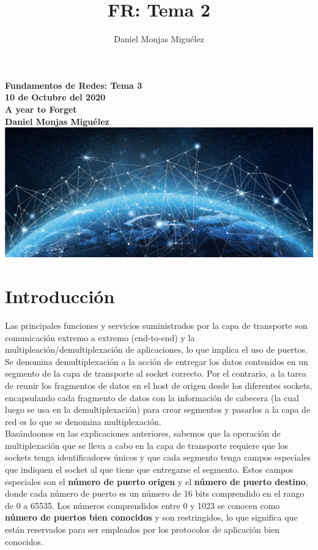\documentclass[a4paper,11pt]{article}
\author{Daniel Monjas Miguélez}
\title{FR: Tema 2}
\begin{document}
\begin{titlepage}
\centering
    \vfill
    {\bfseries\Large
        Fundamentos de Redes: Tema 3\\
        10 de Octubre del 2020\\
        A year to Forget \\
        \vskip2cm
        Daniel Monjas Miguélez\\
    }    
    \vfill
    \includegraphics[width=15cm]{redes.jpg}
    \vfill
    \vfill
\end{titlepage}

\newpage
\tableofcontents
\newpage

\section{Introducción}
Las principales funciones y servicios suministrados por la capa de transporte son comunicación extremo a extremo (end-to-end) y la multipleación/demultiplexación de aplicaciones, lo que implica el uso de puertos. \\

Se denomina demultiplexación a la acción de entregar los datos contenidos en un segmento de la capa de transporte al socket correcto. Por el contrario, a la tarea de reunir los fragmentos de datos en el host de origen desde los diferentes sockets, encapsulando cada fragmento de datos con la información de cabecera (la cual luego se usa en la demultiplexación) para crear segmentos y pasarlos a la capa de red es lo que se denomina multiplexación. \\

Basándoonos en las explicaciones anteriores, sabemos que la operación de multiplexación que se lleva a cabo en la capa de transporte requiere que los sockets tenga identificadores únicos y que cada segmento tenga campos especiales que indiquen el socket al que tiene que entregarse el segmento. Estos campos especiales son el \textbf{número de puerto origen} y el \textbf{número de puerto destino}, donde cada número de puerto es un número de 16 bits comprendido en el rango de 0 a 65535. Los números comprendidos entre 0 y 1023 se conocen como \textbf{número de puertos bien conocidos} y son restringidos, lo que significa que están reservados para ser empleados por los protocolos de aplicación bien conocidos. \\
\end{document}
